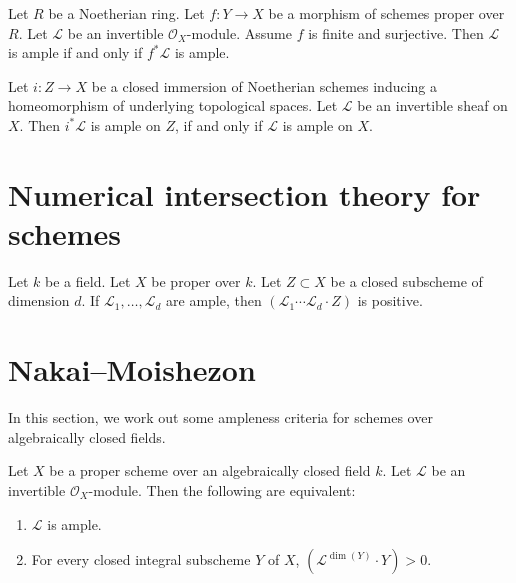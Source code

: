 \begin{lemma}
\label{lemma-surjective-finite-morphism-ample}
Let $R$ be a Noetherian ring. Let $f : Y \to X$ be a morphism of
schemes proper over $R$. Let $\mathcal{L}$ be an
invertible $\mathcal{O}_X$-module. Assume $f$ is finite and surjective.
Then $\mathcal{L}$ is ample if and only if $f^*\mathcal{L}$ is ample.
\end{lemma}

\begin{lemma}
\label{lemma-ample-on-reduction}
Let $i : Z \to X$ be a closed immersion of Noetherian schemes
inducing a homeomorphism of underlying topological spaces.
Let $\mathcal{L}$ be an invertible sheaf on $X$.
Then $i^*\mathcal{L}$ is ample on $Z$, if and only if
$\mathcal{L}$ is ample on $X$.
\end{lemma}

\section{Numerical intersection theory for schemes}

\begin{lemma}
\label{lemma-ample-positive}
Let $k$ be a field. Let $X$ be proper over $k$. Let $Z \subset X$ be
a closed subscheme of dimension $d$. If $\mathcal{L}_1, \ldots, \mathcal{L}_d$
are ample, then $(\mathcal{L}_1 \cdots \mathcal{L}_d \cdot Z)$ is positive.
\end{lemma}

\section{Nakai--Moishezon}
In this section, we work out some ampleness criteria for schemes over
algebraically closed fields.

\begin{theorem}
\label{theorem-nakai-moishezon}
Let $X$ be a proper scheme over an algebraically closed field $k$.
Let $\mathcal{L}$ be an invertible $\mathcal{O}_X$-module.
Then the following are equivalent:
\begin{enumerate}
  \item $\mathcal{L}$ is ample.
  \item For every closed integral subscheme $Y$ of $X$,
    $(\mathcal{L}^{\dim(Y)} \cdot Y) > 0$.
\end{enumerate}
\end{theorem}

